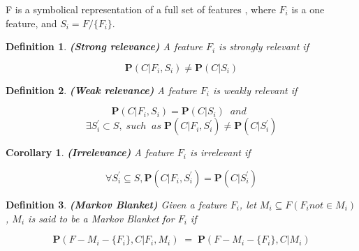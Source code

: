 \documentclass[a4paper,fleqn]{report}
\newtheorem{definition}{Definition}
\newtheorem{corollary}{Corollary}
\begin{document}
F is a symbolical representation of a full set of features , where $F_i$ is a one feature, and $S_i = F / \{F_i \}.$ 

\begin{definition}{\bf (Strong relevance)} A feature $F_i$ is strongly relevant if
\end{definition}
\begin{equation}
         \mathbf{P} ( C|F_{i}, S_{i} ) \neq \mathbf{P} ( C|S_{i} ) \nonumber
\end{equation}

\begin{definition}{\bf (Weak relevance)} A feature $F_i$ is weakly relevant if
\end{definition}
\begin{equation} 
       \mathbf{P} ( C|F_{i}, S_{i} ) = \mathbf{P} ( C|S_{i} ) \;\;and\;\; \nonumber
\end{equation}
\begin{equation} 
         \exists S^{'}_{i} \subset S, \; such\;\; as\; \mathbf{P} ( C|F_{i}, S^{'}_{i} )
         \neq \mathbf{P} ( C|S^{'}_{i} ) \nonumber
\end{equation}

\begin{corollary}{\bf (Irrelevance)} A feature $F_i$ is irrelevant if\end{corollary}
\begin{equation}
       \forall S^{'}_{i} \subseteq S, \mathbf{P} ( C|F_{i}, S^{'}_{i} ) = \mathbf{P} ( C|S^{'}_{i} )
\end{equation}
\begin{definition}{\bf (Markov Blanket)} Given a feature $F_i$, let $M_{i} \subseteq F ( F_{i} not \in M_{i} ) $, $M_{i}$
 is said to be a Markov Blanket for $F_i$ if
\end{definition}
\begin{equation}
         \mathbf{P} ( F - M_{i} - \{ F_{i} \} , C | F_{i}, M_{i}) \;=\;
         \mathbf{P} ( F - M_{i} - \{ F_{i} \} , C | M_{i} )
\end{equation}
\end{document}
